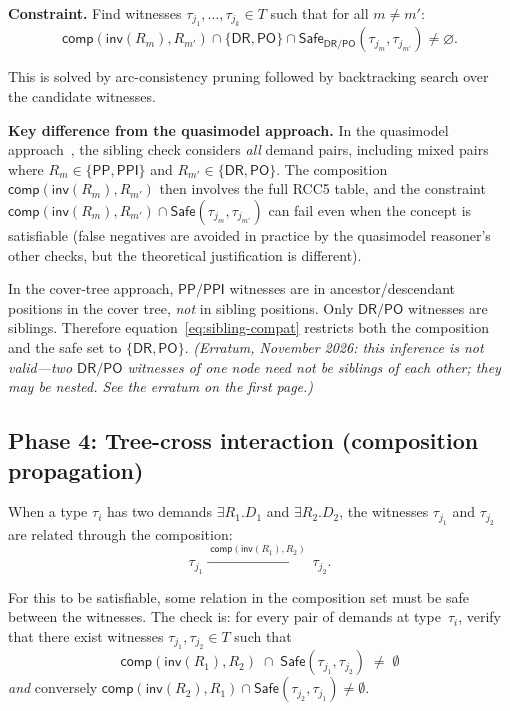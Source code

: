\documentclass[a4paper,11pt]{article}
\theoremstyle{definition}
\newcommand{\DR}{\ensuremath{\mathsf{DR}}}
\newcommand{\PO}{\ensuremath{\mathsf{PO}}}
\newcommand{\PP}{\ensuremath{\mathsf{PP}}}
\newcommand{\PPI}{\ensuremath{\mathsf{PPI}}}
\newcommand{\inv}{\ensuremath{\mathsf{inv}}}
\newcommand{\comp}{\ensuremath{\mathsf{comp}}}
\newcommand{\Safe}{\ensuremath{\mathsf{Safe}}}
\begin{document}
\medskip
\noindent\textbf{Constraint.}
Find witnesses $\tau_{j_1}, \ldots, \tau_{j_k} \in T$ such that
for all $m \neq m'$:
\begin{equation}
  \comp(\inv(R_m), R_{m'}) \cap \{\DR, \PO\} \cap
    \Safe_{\DR/\PO}(\tau_{j_m}, \tau_{j_{m'}}) \neq \varnothing.
  \label{eq:sibling-compat}
\end{equation}

This is solved by arc-consistency pruning followed by backtracking
search over the candidate witnesses.

\medskip
\noindent\textbf{Key difference from the quasimodel approach.}
In the quasimodel approach~\cite{ClaudeDecidability}, the sibling
check considers \emph{all} demand pairs, including mixed pairs
where $R_m \in \{\PP,\PPI\}$ and $R_{m'} \in \{\DR,\PO\}$.
The composition $\comp(\inv(R_m), R_{m'})$ then involves the
full RCC5 table, and the constraint
$\comp(\inv(R_m), R_{m'}) \cap \Safe(\tau_{j_m}, \tau_{j_{m'}})$
can fail even when the concept is satisfiable (false negatives
are avoided in practice by the quasimodel reasoner's other
checks, but the theoretical justification is different).

In the cover-tree approach, $\PP/\PPI$ witnesses are in
ancestor/descendant positions in the cover tree, \emph{not}
in sibling positions.  Only $\DR/\PO$ witnesses are siblings.
Therefore equation~\eqref{eq:sibling-compat} restricts both the
composition and the safe set to $\{\DR,\PO\}$.
\emph{(Erratum, November 2026: this inference is not valid---two
$\DR/\PO$ witnesses of one node need not be siblings of each other; they
may be nested.  See the erratum on the first page.)}

\subsection{Phase 4: Tree-cross interaction (composition propagation)}
\label{sec:singleton}

When a type $\tau_i$ has two demands $\exists R_1.D_1$
and $\exists R_2.D_2$,
the witnesses $\tau_{j_1}$ and $\tau_{j_2}$ are related through
the composition:
\begin{equation}
  \tau_{j_1} \xrightarrow{\;\comp(\inv(R_1), R_2)\;}
  \tau_{j_2}.
  \label{eq:composition-chain}
\end{equation}

For this to be satisfiable, some relation in the composition
set must be safe between the witnesses.  The check is:
for every pair of demands at type~$\tau_i$,
verify that there exist witnesses
$\tau_{j_1}, \tau_{j_2} \in T$ such that
\[
  \comp(\inv(R_1), R_2) \;\cap\; \Safe(\tau_{j_1}, \tau_{j_2})
  \;\neq\; \emptyset
\]
\emph{and} conversely
$\comp(\inv(R_2), R_1) \cap \Safe(\tau_{j_2}, \tau_{j_1})
\neq \emptyset$.
\end{document}
